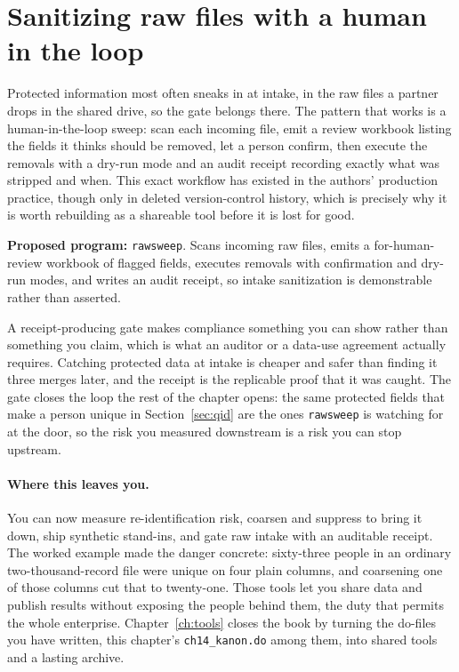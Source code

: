 \documentclass[
    a4paper,
    fontsize=10pt,
    twoside=true,
    numbers=noenddot,
]{kaobook}
\begin{document}
\section{Sanitizing raw files with a human in the loop}\label{sec:rawsweep}
Protected information most often sneaks in at intake, in the raw files a partner drops in the shared drive, so the gate belongs there. The pattern that works is a human-in-the-loop sweep: scan each incoming file, emit a review workbook listing the fields it thinks should be removed, let a person confirm, then execute the removals with a dry-run mode and an audit receipt recording exactly what was stripped and when. This exact workflow has existed in the authors' production practice, though only in deleted version-control history, which is precisely why it is worth rebuilding as a shareable tool before it is lost for good.

\begin{kaobox}[frametitle=Ado-file Idea: \texttt{rawsweep}]
\textbf{Proposed program:} \texttt{rawsweep}. Scans incoming raw files, emits a for-human-review workbook of flagged fields, executes removals with confirmation and dry-run modes, and writes an audit receipt, so intake sanitization is demonstrable rather than asserted.
\end{kaobox}

A receipt-producing gate makes compliance something you can show rather than something you claim, which is what an auditor or a data-use agreement actually requires. Catching protected data at intake is cheaper and safer than finding it three merges later, and the receipt is the replicable proof that it was caught. The gate closes the loop the rest of the chapter opens: the same protected fields that make a person unique in Section~\ref{sec:qid} are the ones \texttt{rawsweep} is watching for at the door, so the risk you measured downstream is a risk you can stop upstream.

\paragraph{Where this leaves you.} You can now measure re-identification risk, coarsen and suppress to bring it down, ship synthetic stand-ins, and gate raw intake with an auditable receipt. The worked example made the danger concrete: sixty-three people in an ordinary two-thousand-record file were unique on four plain columns, and coarsening one of those columns cut that to twenty-one. Those tools let you share data and publish results without exposing the people behind them, the duty that permits the whole enterprise. Chapter~\ref{ch:tools} closes the book by turning the do-files you have written, this chapter's \texttt{ch14\_kanon.do} among them, into shared tools and a lasting archive.
\end{document}
